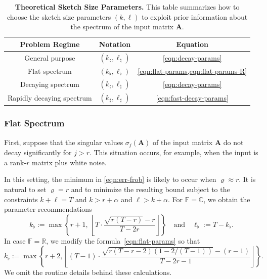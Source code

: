 \documentclass[final]{siamart1116}
\numberwithin{equation}{section}
\numberwithin{theorem}{section}
\numberwithin{figure}{section}
\newcommand{\R}{\mathbb{R}}
\newcommand{\C}{\mathbb{C}}
\newcommand{\F}{\mathbb{F}}
\newcommand{\mtx}[1]{\bm{#1}}
\begin{document}
\begin{table}[t]
\begin{center}
\caption{\textbf{Theoretical Sketch Size Parameters.}  This table summarizes
how to choose the sketch size parameters $(k, \ell)$ to exploit
prior information about the spectrum of the input matrix $\mtx{A}$.}
\label{tab:theory-params}
\begin{tabular}{|c|c|c|}
\hline
Problem Regime & Notation & Equation \\
\hline\hline
General purpose & $(k_{\natural}, \ell_{\natural})$ & \cref{eqn:decay-params} \\
\hline
Flat spectrum & $(k_{\flat}, \ell_{\flat})$ & \cref{eqn:flat-params,eqn:flat-params-R} \\
Decaying spectrum & $(k_{\natural}, \ell_{\natural})$ & \cref{eqn:decay-params} \\
Rapidly decaying spectrum & $(k_{\sharp}, \ell_{\sharp})$ & \cref{eqn:fast-decay-params} \\
\hline
\end{tabular}
\end{center}
\end{table}


\subsubsection{Flat Spectrum}

First, suppose that the singular values $\sigma_j(\mtx{A})$ of the input matrix $\mtx{A}$
do not decay significantly for $j > r$.  This situation occurs, for example,
when the input is a rank-$r$ matrix plus white noise.

In this setting, the minimum in \cref{eqn:err-frob} is likely to occur when $\varrho \approx r$.
It is natural to set $\varrho = r$ and to minimize the resulting bound
subject to the constraints $k + \ell = T$ and $k > r + \alpha$ and $\ell > k + \alpha$.
For $\F = \C$, we obtain the parameter recommendations
\begin{equation} \label{eqn:flat-params}
k_{\flat} := \max\left\{ r + 1, \
\left \lfloor T \cdot \frac{\sqrt{r(T - r)} - r}{T - 2r} \right \rfloor \right\}
\quad\text{and}\quad
\ell_{\flat} := T - k_{\flat}.
\end{equation}
In case $\F = \R$, we modify the formula~\cref{eqn:flat-params}
so that
\begin{equation} \label{eqn:flat-params-R}
k_{\flat} := \max\left\{ r + 2, \left \lfloor (T-1) \cdot \frac{\sqrt{r(T - r - 2)(1 - 2/(T-1))} - (r-1)}{T - 2r - 1} \right \rfloor \right\}.
\end{equation}
We omit the routine details behind these calculations.
\end{document}
